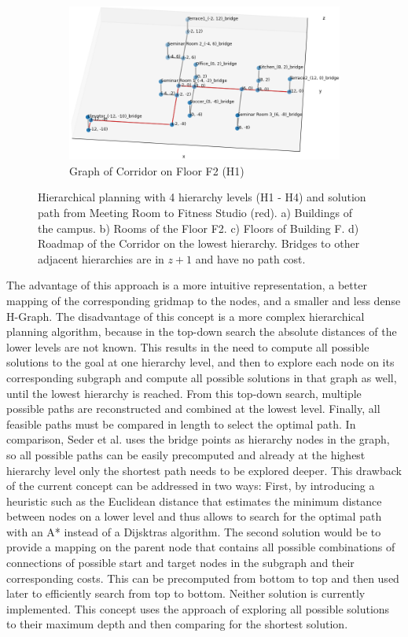 \begin{figure}[htb]
\begin{subfigure}{.8\textwidth}
      \includegraphics[width=\textwidth]{figures/40_concept/ltc_graph_corridor.png}
      \caption{Graph of Corridor on Floor F2 (H1)}
    \end{subfigure}
    \caption[Hierarchical path planning with 4 hierarchy levels]{Hierarchical planning with 4 hierarchy levels (H1 - H4) and solution path from Meeting Room to Fitness Studio (red). a) Buildings of the campus. b) Rooms of the Floor F2. c) Floors of Building F. d) Roadmap of the Corridor on the lowest hierarchy. Bridges to other adjacent hierarchies are in \(z+1\) and have no path cost.}
    \label{fig:hierarchical_planning}
\end{figure}

The advantage of this approach is a more intuitive representation, a better mapping of the corresponding gridmap to the nodes, and a smaller and less dense H-Graph. The disadvantage of this concept is a more complex hierarchical planning algorithm, because in the top-down search the absolute distances of the lower levels are not known. This results in the need to compute all possible solutions to the goal at one hierarchy level, and then to explore each node on its corresponding subgraph and compute all possible solutions in that graph as well, until the lowest hierarchy is reached. From this top-down search, multiple possible paths are reconstructed and combined at the lowest level. Finally, all feasible paths must be compared in length to select the optimal path. In comparison, Seder et al. \cite{seder_hierarchical_2011} uses the bridge points as hierarchy nodes in the graph, so all possible paths can be easily precomputed and already at the highest hierarchy level only the shortest path needs to be explored deeper. This drawback of the current concept can be addressed in two ways: First, by introducing a heuristic such as the Euclidean distance that estimates the minimum distance between nodes on a lower level and thus allows to search for the optimal path with an A* instead of a Dijsktras algorithm. The second solution would be to provide a mapping on the parent node that contains all possible combinations of connections of possible start and target nodes in the subgraph and their corresponding costs. This can be precomputed from bottom to top and then used later to efficiently search from top to bottom. Neither solution is currently implemented. This concept uses the approach of exploring all possible solutions to their maximum depth and then comparing for the shortest solution.

